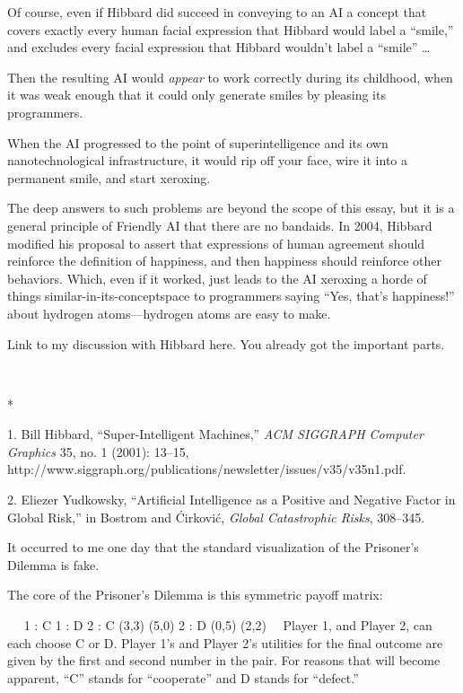 {
 Of course, even if Hibbard did succeed in conveying to an AI a
concept that covers exactly every human facial expression that Hibbard
would label a ``smile,'' and
excludes every facial expression that Hibbard wouldn't
label a ``smile'' \ldots}

{
 Then the resulting AI would \textit{appear} to work correctly
during its childhood, when it was weak enough that it could only
generate smiles by pleasing its programmers.}

{
 When the AI progressed to the point of superintelligence and its
own nanotechnological infrastructure, it would rip off your face, wire
it into a permanent smile, and start xeroxing.}

{
 The deep answers to such problems are beyond the scope of this
essay, but it is a general principle of Friendly AI that there are no
bandaids. In 2004, Hibbard modified his proposal to assert that
expressions of human agreement should reinforce the definition of
happiness, and then happiness should reinforce other behaviors. Which,
even if it worked, just leads to the AI xeroxing a horde of things
similar-in-its-conceptspace to programmers saying
``Yes, that's
happiness!'' about hydrogen atoms---hydrogen atoms
are easy to make.}

{
 Link to my discussion with Hibbard here. You already got the
important parts.}

{\centering
 \ ~
\par}

{\centering
 *
\par}


\bigskip

{
 1. Bill Hibbard, ``Super-Intelligent
Machines,'' \textit{ACM SIGGRAPH Computer Graphics}
35, no. 1 (2001): 13--15,
http://www.siggraph.org/publications/newsletter/issues/v35/v35n1.pdf.}

{
 2. Eliezer Yudkowsky, ``Artificial Intelligence
as a Positive and Negative Factor in Global Risk,''
in Bostrom and \'Cirkovi\'c, \textit{Global Catastrophic Risks},
308--345.}


{
 It occurred to me one day that the standard visualization of the
Prisoner's Dilemma is fake. }

{
 The core of the Prisoner's Dilemma is this
symmetric payoff matrix:}

{
\ ~ 1 : C 1 : D 2 : C (3,3) (5,0) 2 : D (0,5) (2,2) \ \ Player 1, and
Player 2, can each choose C or D. Player 1's and Player
2's utilities for the final outcome are given by the
first and second number in the pair. For reasons that will become
apparent, ``C'' stands for
``cooperate'' and D stands for
``defect.''}


